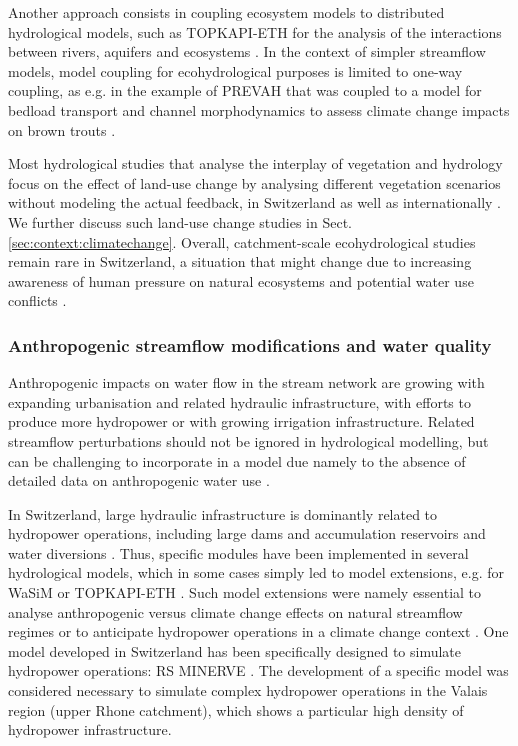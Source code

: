\documentclass[10pt,a4paper]{article}
\begin{document}
Another approach consists in coupling ecosystem models to distributed hydrological models, such as TOPKAPI-ETH for the analysis of the interactions between rivers, aquifers and ecosystems \citep{Foglia2009, Pappas2015}. In the context of simpler streamflow models, model coupling for ecohydrological purposes is limited to one-way coupling, as e.g. in the example of PREVAH that was coupled to a model for bedload transport and channel morphodynamics to assess climate change impacts on brown trouts \citep{Junker2015}. 

Most hydrological studies that analyse the interplay of vegetation and hydrology focus on the effect of land-use change by analysing different vegetation scenarios without modeling the actual feedback, in Switzerland as well as internationally \citep{Dwarakish2015}. We further discuss such land-use change studies in Sect. \ref{sec:context:climatechange}. Overall, catchment-scale ecohydrological studies remain rare in Switzerland, a situation that might change due to increasing awareness of human pressure on natural ecosystems and potential water use conflicts \citep{Milano2016}.


\subsubsection{Anthropogenic streamflow modifications and water quality}
\label{sec:context:infrastructures}

Anthropogenic impacts on water flow in the stream network are growing with expanding urbanisation and related hydraulic infrastructure, with efforts to produce more hydropower \citep{Schaefli2018} or with growing irrigation infrastructure. Related streamflow perturbations should not be ignored in hydrological modelling, but can be challenging to incorporate in a model due namely to the absence of detailed data on anthropogenic water use \citep{FOEN2021}.

In Switzerland, large hydraulic infrastructure is dominantly related to hydropower operations, including large dams and accumulation reservoirs and water diversions \citep{Schaefli2018}. Thus, specific modules have been implemented in several hydrological models, which in some cases simply led to model extensions, e.g. for WaSiM \citep{Verbunt2005} or TOPKAPI-ETH \citep{Fatichi2014}. Such model extensions were namely essential to analyse anthropogenic versus climate change effects on natural streamflow regimes \citep{Fatichi2014} or to anticipate hydropower operations in a climate change context \citep{Fatichi2015b, Anghileri2018}. One model developed in Switzerland has been specifically designed to simulate hydropower operations: RS MINERVE \citep{GarciaHernandez2020, Foehn2020}. The development of a specific model was considered necessary to simulate complex hydropower operations in the Valais region (upper Rhone catchment), which shows a particular high density of hydropower infrastructure.
\end{document}
